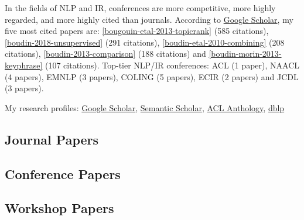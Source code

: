 In the fields of NLP and IR, conferences are more competitive, more highly regarded, and more highly cited than journals.
%
According to \href{https://scholar.google.com/citations?user=Vk68rbkAAAAJ}{Google Scholar}, my five most cited papers are: 
\ref{bougouin-etal-2013-topicrank} {\small (585 citations)}, 
\ref{boudin-2018-unsupervised} {\small (291 citations)}, 
\ref{boudin-etal-2010-combining} {\small (208 citations)}, 
\ref{boudin-2013-comparison} {\small (188 citations)} and 
\ref{boudin-morin-2013-keyphrase} {\small (107 citations)}.
%
Top-tier NLP/IR conferences: 
ACL {\small (1 paper)}, 
NAACL {\small (4 papers)}, 
EMNLP {\small (3 papers)}, 
COLING {\small (5 papers)}, 
ECIR {\small (2 papers)} and 
JCDL {\small (3 papers)}.

\vspace{1em}

My research profiles: 
\href{https://scholar.google.com/citations?user=Vk68rbkAAAAJ}{Google Scholar}, 
\href{https://www.semanticscholar.org/author/Florian-Boudin/2346578}{Semantic Scholar},
\href{https://aclanthology.org/people/f/florian-boudin/}{ACL Anthology},
\href{https://dblp.org/pid/54/2762.html}{dblp}


\subsection{Journal Papers}

\begin{enumerate}[label=(J{\scriptsize\arabic*}),font=\small\bfseries\color{VioletRed},itemsep=0cm]
    
\end{enumerate}

\subsection{Conference Papers}

\begin{enumerate}[label=(C{\scriptsize\arabic*}),font=\small\bfseries\color{VioletRed},itemsep=0cm]
    
\end{enumerate}

\subsection{Workshop Papers}

\begin{enumerate}[label=(W{\scriptsize\arabic*}),font=\small\bfseries\color{VioletRed},itemsep=0cm]
    
\end{enumerate}

